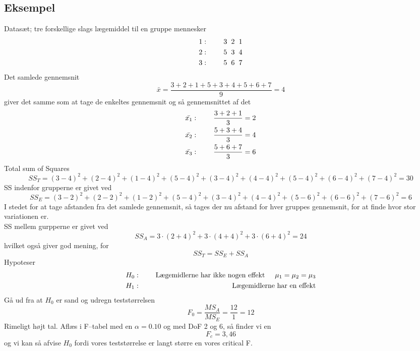 \documentclass[11pt]{article}
\begin{document}
\subsection{Eksempel}
Datasæt; tre forskellige slags lægemiddel til en gruppe mennesker
\begin{eqnarray*}
1&:&\hspace{0.5cm}3\hspace{0.2cm}2\hspace{0.2cm}1\\
2&:&\hspace{0.5cm}5\hspace{0.2cm}3\hspace{0.2cm}4\\
3&:&\hspace{0.5cm}5\hspace{0.2cm}6\hspace{0.2cm}7
\end{eqnarray*}
Det samlede gennemsnit
$$\bar{x}=\frac{3+2+1+5+3+4+5+6+7}{9}=4$$
giver det samme som at tage de enkeltes gennemsnit og så gennemsnittet af det
\begin{eqnarray*}
\bar{x_1}&:&\hspace{0.5cm} \frac{3+2+1}{3}=2\\
\bar{x_2}&:&\hspace{0.5cm} \frac{5+3+4}{3}=4\\
\bar{x_3}&:&\hspace{0.5cm} \frac{5+6+7}{3}=6
\end{eqnarray*}
Total sum of Squares
$$SS_T=(3-4)^2+(2-4)^2+(1-4)^2+(5-4)^2+(3-4)^2+(4-4)^2+(5-4)^2+(6-4)^2+(7-4)^2=30$$
SS indenfor grupperne er givet ved
$$SS_E=(3-2)^2+(2-2)^2+(1-2)^2+(5-4)^2+(3-4)^2+(4-4)^2+(5-6)^2+(6-6)^2+(7-6)^2=6$$
I stedet for at tage afstanden fra det samlede gennemsnit, så tages der nu afstand for hver gruppes gennemsnit, for at finde hvor stor variationen er.\\[0.2cm] 
SS mellem gurpperne er givet ved
$$SS_A=3\cdot(2+4)^2+3\cdot(4+4)^2+3\cdot(6+4)^2=24$$
hvilket også giver god mening, for 
$$SS_T=SS_E+SS_A$$
Hypoteser
\begin{eqnarray*}
H_0&:&\hspace{0.5cm}\text{Lægemidlerne har ikke nogen effekt}\hspace{0.5cm}\mu_1=\mu_2=\mu_3\\
H_1&:&\hspace{0.5cm}\text{Lægemidlerne har en effekt}
\end{eqnarray*}
Gå ud fra at $H_0$ er sand og udregn teststørrelsen
$$F_0=\frac{MS_A}{MS_E}=\frac{12}{1}=12$$
Rimeligt højt tal. Aflæs i F--tabel med en $\alpha=0.10$ og med DoF 2 og 6, så finder vi en 
$$F_c=3,46$$
og vi kan så afvise $H_0$ fordi vores teststørrelse er langt større en vores critical F. 
\end{document}
